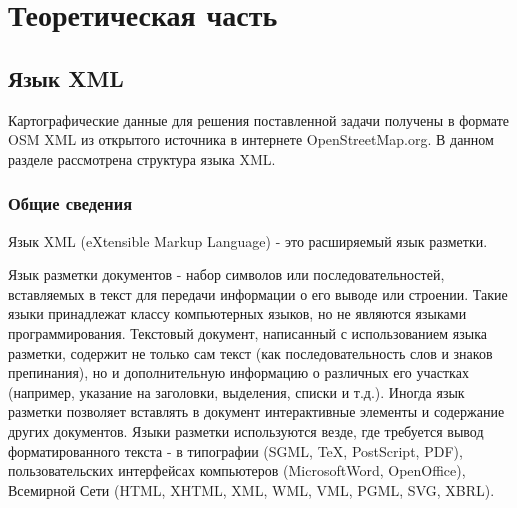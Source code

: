 \documentclass[12pt,a4paper,oneside]{article} %
\begin{document}
\newpage
\section{Теоретическая часть}

\subsection{Язык XML}

Картографические данные для решения поставленной задачи получены \linebreak
в формате OSM XML из открытого источника в интернете OpenStreetMap.org.\linebreak
В данном разделе рассмотрена структура языка XML.

\subsubsection{Общие сведения}

Язык XML (eXtensible Markup Language) - это расширяемый \linebreak
язык разметки.

Язык разметки документов - набор символов или \linebreak
последовательностей, вставляемых в текст для \linebreak
передачи информации о его выводе или строении. Такие языки \linebreak
принадлежат классу компьютерных языков, но не являются языками \linebreak
программирования. Текстовый документ, написанный с использованием \linebreak
языка разметки, содержит не только сам текст (как последовательность \linebreak
слов и знаков препинания), но и дополнительную информацию \linebreak
о различных его участках (например, указание на заголовки, \linebreak
выделения, списки и т.д.). Иногда язык разметки позволяет \linebreak
вставлять в документ интерактивные элементы и содержание \linebreak
других документов. Языки разметки используются везде, где требуется \linebreak
вывод форматированного текста - в типографии (SGML,  TeX, PostScript, \linebreak
PDF), пользовательских интерфейсах компьютеров (MicrosoftWord, \linebreak
OpenOffice), Всемирной Сети (HTML,  XHTML,  XML,  WML,  VML,  PGML,  \linebreak
SVG,  XBRL).
\end{document}

